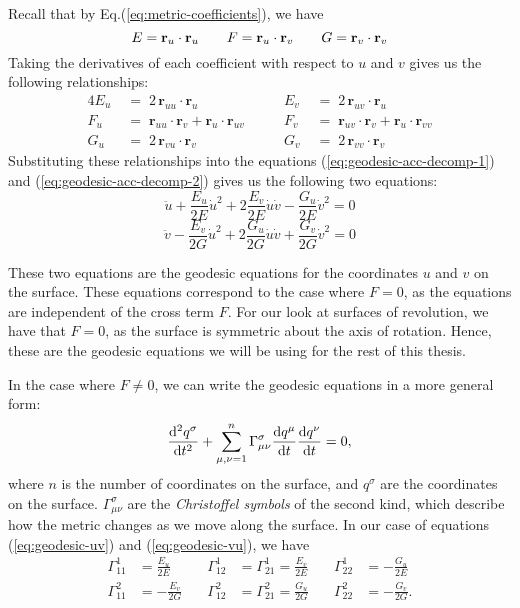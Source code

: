 \documentclass[12pt]{article}
\begin{document}
Recall that by Eq.(\ref{eq:metric-coefficients}), we have
\[
	E = \mathbf{r}_{u} \cdot \mathbf{r}_{u}  \qquad F = \mathbf{r}_{u} \cdot \mathbf{r}_{v} \qquad G = \mathbf{r}_{v} \cdot \mathbf{r}_{v}\\
\]
Taking the derivatives of each coefficient with respect to $u$ and $v$ gives us the following relationships:
\begin{alignat*}{4}
E_{u} \; &=\; 2\,\mathbf{r}_{uu}\cdot \mathbf{r}_{u} \quad &\quad E_{v} \; &=\; 2\,\mathbf{r}_{uv}\cdot \mathbf{r}_{u}\\[5pt]
F_{u} \; &=\; \mathbf{r}_{uu}\cdot \mathbf{r}_{v} + \mathbf{r}_{u}\cdot \mathbf{r}_{uv} \quad &\quad F_{v} \; &=\; \mathbf{r}_{uv}\cdot \mathbf{r}_{v} + \mathbf{r}_{u}\cdot \mathbf{r}_{vv}\\[5pt]
G_{u} \; &=\; 2\,\mathbf{r}_{vu}\cdot \mathbf{r}_{v} \quad &\quad G_{v} \; &=\; 2\,\mathbf{r}_{vv}\cdot \mathbf{r}_{v}
\end{alignat*}
Substituting these relationships into the equations (\ref{eq:geodesic-acc-decomp-1}) and (\ref{eq:geodesic-acc-decomp-2}) gives us the following two equations:
\begin{equation}\label{eq:geodesic-uv}
	\ddot{u} + \frac{E_{u}}{2E}\dot{u}^{2} + 2\frac{E_{v}}{2E}\dot{u}\dot{v} - \frac{G_{u}}{2E}\dot{v}^{2} = 0
\end{equation}
\begin{equation}\label{eq:geodesic-vu}
	\ddot{v} - \frac{E_{v}}{2G}\dot{u}^{2} + 2\frac{G_{u}}{2G}\dot{u}\dot{v} + \frac{G_{v}}{2G}\dot{v}^{2} = 0
\end{equation}

These two equations are the geodesic equations for the coordinates \(u\) and \(v\) on the surface.
These equations correspond to the case where $F = 0$, as the equations are independent of the cross term $F$.
For our look at surfaces of revolution, we have that $F = 0$, as the surface is symmetric about the axis of rotation.
Hence, these are the geodesic equations we will be using for the rest of this thesis.

In the case where $F \neq 0$, we can write the geodesic equations in a more general form:
\begin{equation}\label{eq:geodesic-compact}
	\dv[2]{q^\sigma}{t} + \sum_{\mu,\nu=1}^{n} \Gamma_{\mu\nu}^\sigma \dv{q^\mu}{t} \dv{q^\nu}{t} = 0,
\end{equation}
where $n$ is the number of coordinates on the surface, and $q^\sigma$ are the coordinates on the surface.
$\Gamma_{\mu\nu}^\sigma$ are the \emph{Christoffel symbols} of the second kind, which describe how the metric changes as we move along the surface.
In our case of equations (\ref{eq:geodesic-uv}) and (\ref{eq:geodesic-vu}), we have
\[
\begin{aligned}
    \Gamma_{11}^{1} &= \frac{E_{u}}{2E} &\quad \Gamma_{12}^{1} &= \Gamma_{21}^{1} = \frac{E_{v}}{2E} &\quad \Gamma_{22}^{1} &= -\frac{G_{u}}{2E} \\[4mm]
    \Gamma_{11}^{2} &= -\frac{E_{v}}{2G} &\quad \Gamma_{12}^{2} &= \Gamma_{21}^{2} = \frac{G_{u}}{2G} &\quad \Gamma_{22}^{2} &= -\frac{G_{v}}{2G}.
\end{aligned}
\]
\endgroup
\end{document}
